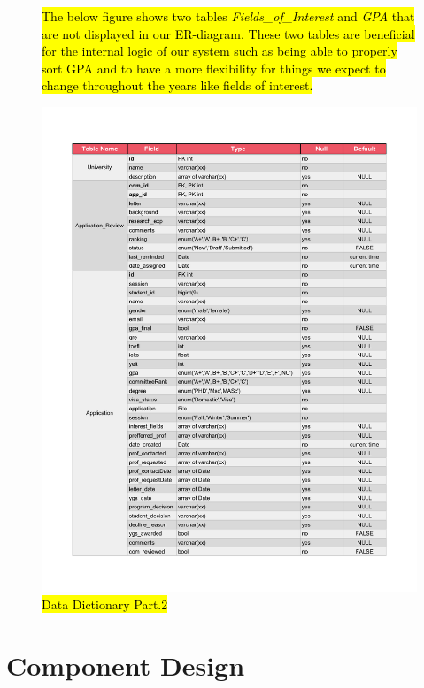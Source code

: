 \documentclass[fontsize=12pt,paper=letter,twoside]{scrartcl}
\begin{document}
\begin{figure}[!htb]
\hl{The below figure shows two tables \emph{Fields\_of\_Interest} and \emph{GPA} that are not displayed in our ER-diagram. These two tables are beneficial for the internal logic of our system such as being able to properly sort GPA and to have a more flexibility for things we expect to change throughout the years like fields of interest.}
\begin{center}
\includegraphics[width=\textwidth, page=2]{images/data_dictionary.pdf}
\end{center}
\caption{\hl{Data Dictionary Part.2}}
\label{fig:dd2}
\end{figure}


\clearpage
\newpage
\section{Component Design}
\end{document}
